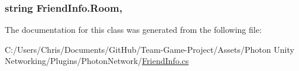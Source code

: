 \subsubsection[{\texorpdfstring{Room}{Room}}]{\setlength{\rightskip}{0pt plus 5cm}string Friend\+Info.\+Room\hspace{0.3cm}{\ttfamily [get]}, {}}\hypertarget{class_friend_info_a40b0b66eced3c5d88c29f6a7409d1315}{}\label{class_friend_info_a40b0b66eced3c5d88c29f6a7409d1315}


The documentation for this class was generated from the following file\+:\begin{DoxyCompactItemize}
\item 
C\+:/\+Users/\+Chris/\+Documents/\+Git\+Hub/\+Team-\/\+Game-\/\+Project/\+Assets/\+Photon Unity Networking/\+Plugins/\+Photon\+Network/\hyperlink{_friend_info_8cs}{Friend\+Info.\+cs}\end{DoxyCompactItemize}
